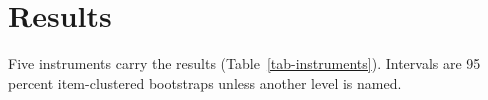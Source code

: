 
\providecommand{\todo}[1]{\textbf{[TODO: #1]}}

\section{Results}
\label{sec-results}

Five instruments carry the results (Table~\ref{tab-instruments}).
Intervals are 95 percent item-clustered bootstraps unless another level is
named. %

